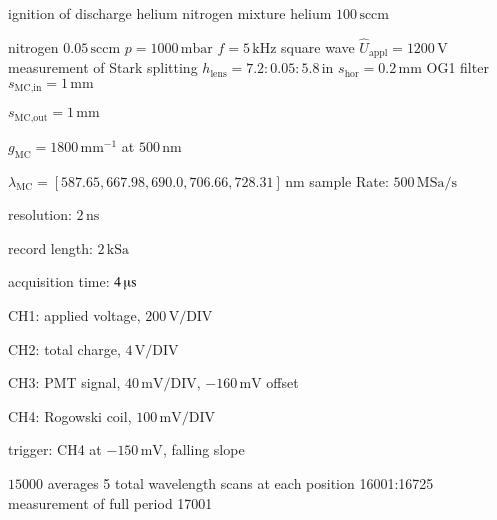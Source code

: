 
\begin{Liste}
	\itemwas ignition of discharge
	 helium nitrogen mixture
	 helium $100\,\text{sccm}$
	\item nitrogen $0.05\,\text{sccm}$
	 $p=1000\,\text{mbar}$
	 $f=5\,\text{kHz}$
	 square wave
	 $\hat U_\text{appl}=1200\,\text{V}$
	\leer
	\itemwas measurement of Stark splitting
	 $h_\text{lens}=7.2:0.05:5.8\,\text{in}$
	 $s_\text{hor}=0.2\,\text{mm}$
	 OG1 filter
 	 $s_\text{MC,in}=1\,\text{mm}$
	\item $s_\text{MC,out}=1\,\text{mm}$
	\item $g_\text{MC}=1800\,\text{mm}^{-1}$ at $500\,\text{nm}$
	\item $\lambda_\text{MC}=[587.65,667.98,690.0,706.66,728.31]\,\text{nm}$
	\leer
	 sample Rate: $500\,\text{MSa}/\text{s}$
	\item resolution: $2\,\text{ns}$
	\item record length: $2\,\text{kSa}$
	\item acquisition time: $4\,\text{\textmu s}$
	\item CH1: applied voltage, $200\,\text{V}/\text{DIV}$
	\item CH2: total charge, $4\,\text{V}/\text{DIV}$
	\item CH3: PMT signal, $40\,\text{mV}/\text{DIV}$, $-160\,\text{mV}$ offset
	\item CH4: Rogowski coil, $100\,\text{mV}/\text{DIV}$
	\item trigger: CH4 at $-150\,\text{mV}$, falling slope
	\item $15000$ averages
	 5 total wavelength scans at each position
	\leer
	 16001:16725
	\leer
	\itemwas measurement of full period
	 17001
\end{Liste}

